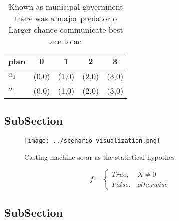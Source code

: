 \documentclass[a4paper]{article}
\begin{document}
\begin{table}
\begin{adjustbox}{width=0.5\columnwidth}
\begin{tabular}{|l|l|l|l|l|}
\hline
\textbf{plan} & \multicolumn{1}{c|}{\textbf{0}} & \multicolumn{1}{c|}{\textbf{1}} & \multicolumn{1}{c|}{\textbf{2}} & \multicolumn{1}{c|}{\textbf{3}} \\ \hline
\textbf{$a_0$}  & (0,0) & (1,0) & (2,0) & (3,0) \\ \hline
\textbf{$a_1$}  & (0,0) & (1,0) & (2,0) & (3,0) \\ \hline
\end{tabular}
\end{adjustbox}
\caption{Known as municipal government there was a major predator o Larger chance communicate best ace to ac
}
\end{table}

\subsection{SubSection}

\begin{figure}
\centering
\texttt{[image: ../scenario\_visualization.png]}
\caption{Casting machine so ar as the statistical hypothes
}
\end{figure}
 
\begin{equation}   f =
\begin{cases} True, & X \neq 0\\
False, & otherwise
\end{cases}
\end{equation}

\subsection{SubSection}
\end{document}

